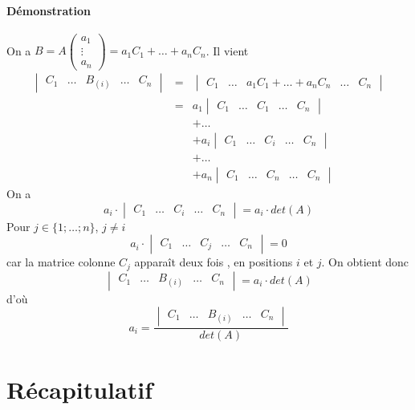 \paragraph{Démonstration} On a $B = A \begin{pmatrix} a_1 \\ \vdots \\ a_n \end{pmatrix} = a_1 C_1 + \ldots + a_n C_n$. Il vient
\begin{eqnarray*}
  \begin{vmatrix} C_1 & \ldots & B_{(i)} & \ldots & C_n \end{vmatrix} &=& \begin{vmatrix} C_1 & \ldots &  a_1 C_1 + \ldots + a_n C_n & \ldots & C_n \end{vmatrix} \\
    &=& a_1 \begin{vmatrix} C_1 & \ldots & C_1 & \ldots & C_n \end{vmatrix} \\
    &&+ \ldots \\
    &&+ a_i \begin{vmatrix} C_1 & \ldots & C_i & \ldots & C_n \end{vmatrix} \\
    &&+ \ldots \\
    &&+ a_n \begin{vmatrix} C_1 & \ldots & C_n & \ldots & C_n \end{vmatrix}
\end{eqnarray*}
On a 
$$a_i \cdot \begin{vmatrix} C_1 & \ldots & C_i & \ldots & C_n \end{vmatrix} = a_i \cdot det(A)$$
Pour $j \in \{1; \ldots; n\}$, $j\neq i$
$$a_i \cdot \begin{vmatrix} C_1 & \ldots & C_j & \ldots & C_n \end{vmatrix} = 0$$
car la matrice colonne $C_j$ apparaît deux fois , en positions $i$ et $j$. On obtient donc 
$$\begin{vmatrix} C_1 & \ldots & B_{(i)} & \ldots & C_n \end{vmatrix} = a_i \cdot det(A)$$
d'où
$$a_i = \frac{\begin{vmatrix} C_1 & \ldots & B_{(i)} & \ldots & C_n \end{vmatrix}}{det(A)}$$

%
%
\section{Récapitulatif}
%
%


